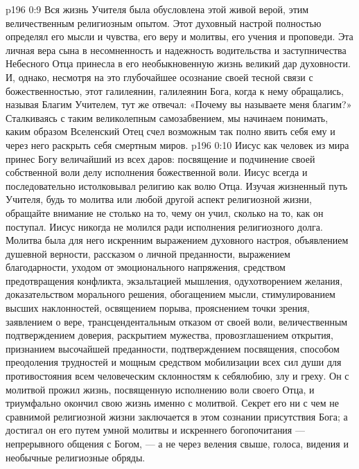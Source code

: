 \vs p196 0:9 Вся жизнь Учителя была обусловлена этой живой верой, этим величественным религиозным опытом. Этот духовный настрой полностью определял его мысли и чувства, его веру и молитвы, его учения и проповеди. Эта личная вера сына в несомненность и надежность водительства и заступничества Небесного Отца принесла в его необыкновенную жизнь великий дар духовности. И, однако, несмотря на это глубочайшее осознание своей тесной связи с божественностью, этот галилеянин, галилеянин Бога, когда к нему обращались, называя Благим Учителем, тут же отвечал: «Почему вы называете меня благим?» Сталкиваясь с таким великолепным самозабвением, мы начинаем понимать, каким образом Вселенский Отец счел возможным так полно явить себя ему и через него раскрыть себя смертным миров.
\vs p196 0:10 Иисус как человек из мира принес Богу величайший из всех даров: посвящение и подчинение своей собственной воли делу исполнения божественной воли. Иисус всегда и последовательно истолковывал религию как волю Отца. Изучая жизненный путь Учителя, будь то молитва или любой другой аспект религиозной жизни, обращайте внимание не столько на то, чему он учил, сколько на то, как он поступал. Иисус никогда не молился ради исполнения религиозного долга. Молитва была для него искренним выражением духовного настроя, объявлением душевной верности, рассказом о личной преданности, выражением благодарности, уходом от эмоционального напряжения, средством предотвращения конфликта, экзальтацией мышления, одухотворением желания, доказательством морального решения, обогащением мысли, стимулированием высших наклонностей, освящением порыва, прояснением точки зрения, заявлением о вере, трансцендентальным отказом от своей воли, величественным подтверждением доверия, раскрытием мужества, провозглашением открытия, признанием высочайшей преданности, подтверждением посвящения, способом преодоления трудностей и мощным средством мобилизации всех сил души для противостояния всем человеческим склонностям к себялюбию, злу и греху. Он с молитвой прожил жизнь, посвященную исполнению воли своего Отца, и триумфально окончил свою жизнь именно с молитвой. Секрет его ни с чем не сравнимой религиозной жизни заключается в этом сознании присутствия Бога; а достигал он его путем умной молитвы и искреннего богопочитания --- непрерывного общения с Богом, --- а не через веления свыше, голоса, видения и необычные религиозные обряды.

